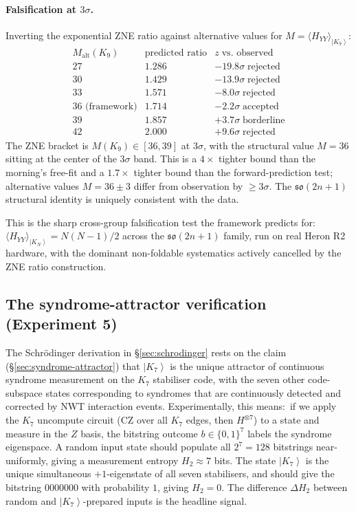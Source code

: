 \documentclass[11pt]{article}
\newcommand{\so}{\mathfrak{so}}
\newcommand{\ket}[1]{\left|#1\right\rangle}
\begin{document}
\paragraph{Falsification at $3\sigma$.}
Inverting the exponential ZNE ratio against alternative values for
$M = \langle H_{YY}\rangle_{\ket{K_9}}$:
\begin{equation}
  \label{eq:K9-zne-falsify}
  \begin{array}{c|cc}
    M_{\text{alt}}(K_9) & \text{predicted ratio} & z \;\text{vs.\ observed} \\\hline
    27 & 1.286 & -19.8\sigma \;\text{rejected} \\
    30 & 1.429 & -13.9\sigma \;\text{rejected} \\
    33 & 1.571 &  -8.0\sigma \;\text{rejected} \\
    \boxed{36 \text{ (framework)}} & 1.714 &  -2.2\sigma \;\text{accepted} \\
    39 & 1.857 &  +3.7\sigma \;\text{borderline} \\
    42 & 2.000 &  +9.6\sigma \;\text{rejected}
  \end{array}
\end{equation}
The ZNE bracket is $M(K_9) \in [36, 39]$ at $3\sigma$, with the
structural value $M = 36$ sitting at the center of the
$3\sigma$ band.  This is a $4\times$ tighter bound than the morning's
free-fit and a $1.7\times$ tighter bound than the forward-prediction
test; alternative values $M = 36 \pm 3$ differ from observation by
$\geq 3\sigma$.  The $\so(2n+1)$ structural identity is uniquely
consistent with the data.

This is the sharp cross-group falsification test the framework
predicts for: $\langle H_{YY}\rangle_{\ket{K_N}} = N(N-1)/2$ across
the $\so(2n+1)$ family, run on real Heron R2 hardware, with the
dominant non-foldable systematics actively cancelled by the ZNE
ratio construction.

\subsection{The syndrome-attractor verification (Experiment 5)}
\label{sec:heron-syndrome}

The Schr\"odinger derivation in \S\ref{sec:schrodinger} rests on the
claim (\S\ref{sec:syndrome-attractor}) that $\ket{K_7}$ is the unique
attractor of continuous syndrome measurement on the $K_7$ stabiliser
code, with the seven other code-subspace states corresponding to
syndromes that are continuously detected and corrected by NWT
interaction events.  Experimentally, this means:\ if we apply the
$K_7$ uncompute circuit (CZ over all $K_7$ edges, then $H^{\otimes 7}$)
to a state and measure in the $Z$ basis, the bitstring outcome
$b \in \{0,1\}^7$ labels the syndrome eigenspace.  A random input
state should populate all $2^7 = 128$ bitstrings near-uniformly,
giving a measurement entropy $H_2 \approx 7$ bits.  The state
$\ket{K_7}$ is the unique simultaneous $+1$-eigenstate of all seven
stabilisers, and should give the bitstring $0000000$ with probability
$1$, giving $H_2 = 0$.  The difference $\Delta H_2$ between random
and $\ket{K_7}$-prepared inputs is the headline signal.
\end{document}
